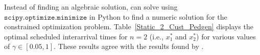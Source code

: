 Instead of finding an algebraic solution, can solve using $\texttt{scipy.optimize.minimize}$ in Python to find a numeric solution for the constrained optimization problem. Table~\ref{Static_2_Cust_Pedgen} displays the optimal scheduled interarrival times for $n = 2$ (i.e., $x_{1}^{*}$ and $x_{2}^{*}$) for various values of $\gamma \in [0.05, 1]$. These results agree with the results found by \citet{Pegden}.











































